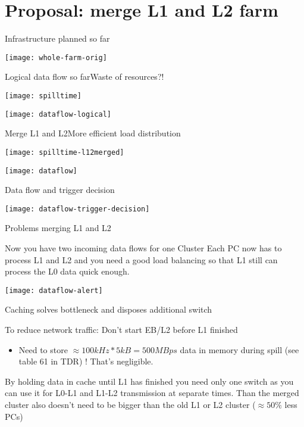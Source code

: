 \section{Proposal: merge L1 and L2 farm}

\begin{frame}{Infrastructure planned so far}{}
	\begin{center} 
		\texttt{[image: whole-farm-orig]}
	\end{center} 
\end{frame}

\begin{frame}{Logical data flow so far}{Waste of resources?!}
	\begin{center} 
		\texttt{[image: spilltime]}
	\end{center} 
		\texttt{[image: dataflow-logical]}
\end{frame}

\begin{frame}{Merge L1 and L2}{More efficient load distribution}
	\begin{center} 
		\texttt{[image: spilltime-l12merged]}
	\end{center} 
		\texttt{[image: dataflow]}
\end{frame}

\begin{frame}{Data flow and trigger decision}{}
	\begin{center} 
		\texttt{[image: dataflow-trigger-decision]}
	\end{center} 
\end{frame}

\begin{frame}{Problems merging L1 and L2}{}
\begin{alertblock}{Now you have two incoming data flows for one Cluster}
	Each PC now has to process L1 and L2 and you need a good load balancing so that
	L1 still can process the L0 data quick enough.
\end{alertblock}
		\texttt{[image: dataflow-alert]}
\end{frame}

\begin{frame}{Caching solves bottleneck and disposes additional switch}{}
		\begin{block}{To reduce network
	traffic: Don't start EB/L2 before L1 finished}
		\begin{itemize}
			\item Need to store $\approx100kHz*5kB=500MBps$ data in memory during
			spill \tiny(see table 61 in TDR) \normalsize{}! That's negligible.
		\end{itemize}
	\end{block}
	
	\begin{ergo}
		By holding data in cache until L1 has finished you need only one switch as you
		can use it for L0-L1 and L1-L2 transmission at separate times. Than the merged
		cluster also doesn't need to be bigger than the old L1 or L2 cluster ($\approx
		50 \%$ less PCs)
	\end{ergo}
\end{frame}

